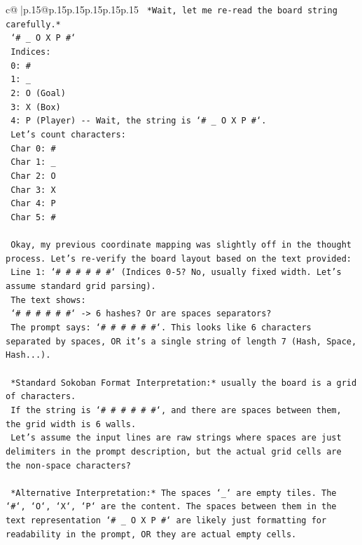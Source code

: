 \documentclass{article}
\begin{document}
{\begin{supertabular}{c@{$\;$}|p{.15\linewidth}@{}p{.15\linewidth}p{.15\linewidth}p{.15\linewidth}p{.15\linewidth}p{.15\linewidth}}
{{{\texttt{    *Wait, let me re{-}read the board string carefully.*} \\
\texttt{    `\# \_ O X P \#`} \\
\texttt{    Indices:} \\
\texttt{    0: \#} \\
\texttt{    1: \_} \\
\texttt{    2: O (Goal)} \\
\texttt{    3: X (Box)} \\
\texttt{    4: P (Player) {-}{-} Wait, the string is `\# \_ O X P \#`.} \\
\texttt{    Let's count characters:} \\
\texttt{    Char 0: \#} \\
\texttt{    Char 1: \_} \\
\texttt{    Char 2: O} \\
\texttt{    Char 3: X} \\
\texttt{    Char 4: P} \\
\texttt{    Char 5: \#} \\
\\ 
\texttt{    Okay, my previous coordinate mapping was slightly off in the thought process. Let's re{-}verify the board layout based on the text provided:} \\
\texttt{    Line 1: `\# \# \# \# \# \#` (Indices 0{-}5? No, usually fixed width. Let's assume standard grid parsing).} \\
\texttt{    The text shows:} \\
\texttt{    `\# \# \# \# \# \#` {-}> 6 hashes? Or are spaces separators?} \\
\texttt{    The prompt says: `\# \# \# \# \# \#`. This looks like 6 characters separated by spaces, OR it's a single string of length 7 (Hash, Space, Hash...).} \\
\\ 
\texttt{    *Standard Sokoban Format Interpretation:* usually the board is a grid of characters.} \\
\texttt{    If the string is `\# \# \# \# \# \#`, and there are spaces between them, the grid width is 6 walls.} \\
\texttt{    Let's assume the input lines are raw strings where spaces are just delimiters in the prompt description, but the actual grid cells are the non{-}space characters?} \\
\\ 
\texttt{    *Alternative Interpretation:* The spaces `\_` are empty tiles. The `\#`, `O`, `X`, `P` are the content. The spaces between them in the text representation `\# \_ O X P \#` are likely just formatting for readability in the prompt, OR they are actual empty cells.} \\
}}}
\end{supertabular}}
\end{document}
